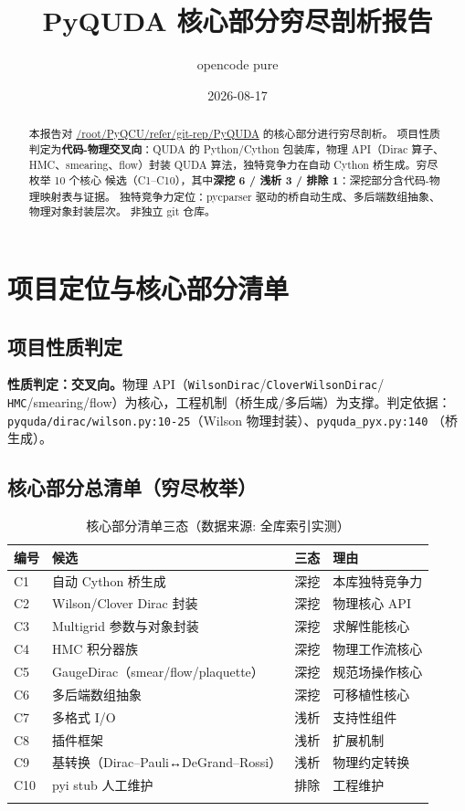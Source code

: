 \documentclass[UTF8]{ctexart}
\title{PyQUDA 核心部分穷尽剖析报告}
\author{opencode pure}
\date{2026-08-17}
\begin{document}
\maketitle

\begin{abstract}
本报告对 \url{/root/PyQCU/refer/git-rep/PyQUDA} 的核心部分进行穷尽剖析。
项目性质判定为\textbf{代码-物理交叉向}：QUDA 的 Python/Cython 包装库，物理 API（Dirac 算子、
HMC、smearing、flow）封装 QUDA 算法，独特竞争力在自动 Cython 桥生成。穷尽枚举 10 个核心
候选（C1--C10），其中\textbf{深挖 6 / 浅析 3 / 排除 1}：深挖部分含代码-物理映射表与证据。
独特竞争力定位：pycparser 驱动的桥自动生成、多后端数组抽象、物理对象封装层次。
非独立 git 仓库。
\end{abstract}

\tableofcontents

\section{项目定位与核心部分清单}

\subsection{项目性质判定}
\begin{keybox}
\textbf{性质判定：交叉向。}物理 API（\texttt{WilsonDirac}/\texttt{CloverWilsonDirac}/
\texttt{HMC}/smearing/flow）为核心，工程机制（桥生成/多后端）为支撑。判定依据：
\texttt{pyquda/dirac/wilson.py:10-25}（Wilson 物理封装）、\texttt{pyquda\_pyx.py:140}
（桥生成）。
\end{keybox}

\subsection{核心部分总清单（穷尽枚举）}
\begin{xltabular}{\textwidth}{lXXX}
\toprule
\textcolor{map}{编号} & 候选 & 三态 & 理由 \\
\midrule
\endhead
C1 & 自动 Cython 桥生成 & 深挖 & 本库独特竞争力 \\
C2 & Wilson/Clover Dirac 封装 & 深挖 & 物理核心 API \\
C3 & Multigrid 参数与对象封装 & 深挖 & 求解性能核心 \\
C4 & HMC 积分器族 & 深挖 & 物理工作流核心 \\
C5 & GaugeDirac（smear/flow/plaquette）& 深挖 & 规范场操作核心 \\
C6 & 多后端数组抽象 & 深挖 & 可移植性核心 \\
C7 & 多格式 I/O & 浅析 & 支持性组件 \\
C8 & 插件框架 & 浅析 & 扩展机制 \\
C9 & 基转换（Dirac--Pauli↔DeGrand--Rossi）& 浅析 & 物理约定转换 \\
C10 & pyi stub 人工维护 & 排除 & 工程维护 \\
\bottomrule
\caption{核心部分清单三态（数据来源: 全库索引实测）}
\end{xltabular}
\end{document}
